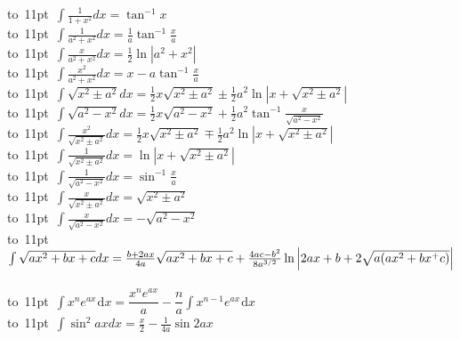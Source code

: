 \begin{footnotesize}
\mbox{\vbox to 11pt{  \hbox{$
\int \frac{1}{1+x^2}dx = \tan^{-1}x
$}  }}
\\
\mbox{\vbox to 11pt{  \hbox{$
\int \frac{1}{a^2+x^2}dx = \frac{1}{a}\tan^{-1}\frac{x}{a}
$}  }}
\\
\mbox{\vbox to 11pt{  \hbox{$
\int \frac{x}{a^2+x^2}dx = \frac{1}{2}\ln|a^2+x^2|
$}  }}
\\
\mbox{\vbox to 11pt{  \hbox{$
\int \frac{x^2}{a^2+x^2}dx = x-a\tan^{-1}\frac{x}{a}
$}  }}
\\
\mbox{\vbox to 11pt{  \hbox{$
\int\sqrt{x^2 \pm a^2} dx  = \frac{1}{2}x\sqrt{x^2\pm a^2} 
\pm\frac{1}{2}a^2 \ln \left | x + \sqrt{x^2\pm a^2} \right | 
$}  }}
\\
\mbox{\vbox to 11pt{  \hbox{$
\int  \sqrt{a^2 - x^2} dx  = \frac{1}{2} x \sqrt{a^2-x^2} 
+\frac{1}{2}a^2\tan^{-1}\frac{x}{\sqrt{a^2-x^2}}
$}  }}
\\
\mbox{\vbox to 11pt{  \hbox{$
\int \frac{x^2}{\sqrt{x^2 \pm a^2}} dx  = \frac{1}{2}x\sqrt{x^2 \pm a^2}
\mp \frac{1}{2}a^2 \ln \left| x + \sqrt{x^2\pm a^2} \right | 
$}  }}
\\
\mbox{\vbox to 11pt{  \hbox{$
\int \frac{1}{\sqrt{x^2 \pm a^2}} dx = \ln \left | x + \sqrt{x^2 \pm a^2} \right | 
$}  }}
\\
\mbox{\vbox to 11pt{  \hbox{$
\int \frac{1}{\sqrt{a^2 - x^2}} dx = \sin^{-1}\frac{x}{a} 
$}  }}
\\
\mbox{\vbox to 11pt{  \hbox{$
\int \frac{x}{\sqrt{x^2\pm a^2}}dx = \sqrt{x^2 \pm a^2} 
$}  }}
\\
\mbox{\vbox to 11pt{  \hbox{$
\int \frac{x}{\sqrt{a^2-x^2}}dx = -\sqrt{a^2-x^2} 
$}  }}
\\
\mbox{\vbox to 11pt{  \hbox{$
\int  \sqrt{a x^2 + b x + c} dx = 
\frac{b+2ax}{4a}\sqrt{ax^2+bx+c}
\nonumber \\  
+
\frac{4ac-b^2}{8a^{3/2}}\ln \left| 2ax + b + 2\sqrt{a(ax^2+bx^+c)}\right |
$}  }}
\\
\mbox{\vbox to 11pt{  \hbox{$
\int x^n e^{ax}\hspace{1pt}\text{d}x = \dfrac{x^n e^{ax}}{a} - 
\dfrac{n}{a}\int x^{n-1}e^{ax}\hspace{1pt}\text{d}x
$}  }} 
\\
\mbox{\vbox to 11pt{  \hbox{$
\int \sin^2 ax dx = \frac{x}{2} - \frac{1} {4a} \sin{2ax}
$}  }}
\\

\end{footnotesize}

